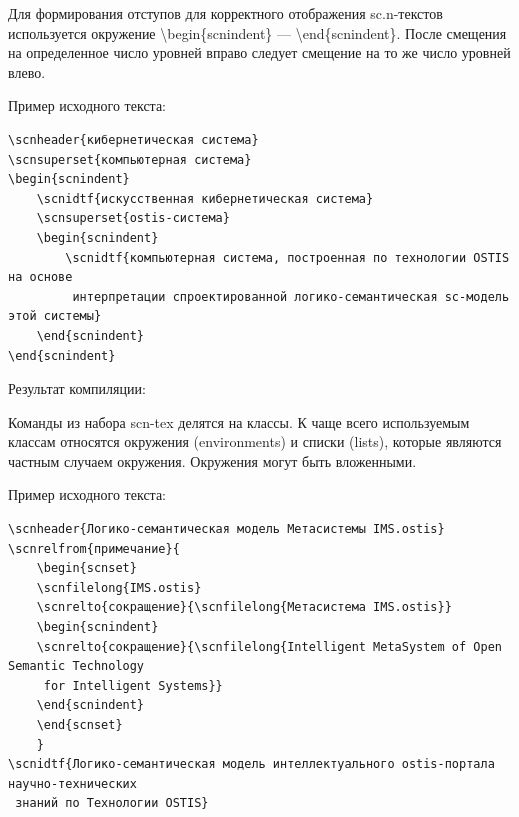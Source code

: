 Для формирования отступов для корректного отображения sc.n-текстов используется окружение \textbackslash begin\{scnindent\} --- \textbackslash end\{scnindent\}. После смещения на определенное число уровней вправо следует смещение на то же число уровней влево.

Пример исходного текста:

\begin{verbatim}
\scnheader{кибернетическая система}
\scnsuperset{компьютерная система}
\begin{scnindent}
    \scnidtf{искусственная кибернетическая система}
    \scnsuperset{ostis-система}
    \begin{scnindent}
        \scnidtf{компьютерная система, построенная по технологии OSTIS на основе
		 интерпретации спроектированной логико-семантическая sc-модель этой системы}
    \end{scnindent}
\end{scnindent}
\end{verbatim}

Результат компиляции:

\begin{SCn}
\begin{scnindent}
    \begin{scnindent}
    \end{scnindent}
\end{scnindent}
\end{SCn}

\bigskip

Команды из набора scn-tex делятся на классы. К чаще всего используемым классам относятся окружения (environments) и списки (lists), которые являются частным случаем окружения. Окружения могут быть вложенными. 

\bigskip

Пример исходного текста:

\bigskip

\begin{verbatim}
\scnheader{Логико-семантическая модель Метасистемы IMS.ostis}
\scnrelfrom{примечание}{
	\begin{scnset}
	\scnfilelong{IMS.ostis}
	\scnrelto{сокращение}{\scnfilelong{Метасистема IMS.ostis}}
	\begin{scnindent}
	\scnrelto{сокращение}{\scnfilelong{Intelligent MetaSystem of Open Semantic Technology
	 for Intelligent Systems}}
	\end{scnindent}
	\end{scnset}
	}
\scnidtf{Логико-семантическая модель интеллектуального ostis-портала научно-технических
 знаний по Технологии OSTIS}
\end{verbatim}

